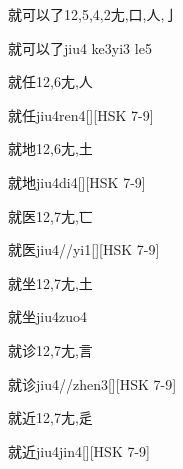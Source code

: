 \begin{Entry}{就可以了}{12,5,4,2}{⼪,⼝,⼈,⼅}
  \begin{Phonetics}{就可以了}{jiu4 ke3yi3 le5}
  \end{Phonetics}
\end{Entry}

\begin{Entry}{就任}{12,6}{⼪,⼈}
  \begin{Phonetics}{就任}{jiu4ren4}[][HSK 7-9]
  \end{Phonetics}
\end{Entry}

\begin{Entry}{就地}{12,6}{⼪,⼟}
  \begin{Phonetics}{就地}{jiu4di4}[][HSK 7-9]
  \end{Phonetics}
\end{Entry}

\begin{Entry}{就医}{12,7}{⼪,⼖}
  \begin{Phonetics}{就医}{jiu4//yi1}[][HSK 7-9]
  \end{Phonetics}
\end{Entry}

\begin{Entry}{就坐}{12,7}{⼪,⼟}
  \begin{Phonetics}{就坐}{jiu4zuo4}
  \end{Phonetics}
\end{Entry}

\begin{Entry}{就诊}{12,7}{⼪,⾔}
  \begin{Phonetics}{就诊}{jiu4//zhen3}[][HSK 7-9]
  \end{Phonetics}
\end{Entry}

\begin{Entry}{就近}{12,7}{⼪,⾡}
  \begin{Phonetics}{就近}{jiu4jin4}[][HSK 7-9]
  \end{Phonetics}
\end{Entry}

